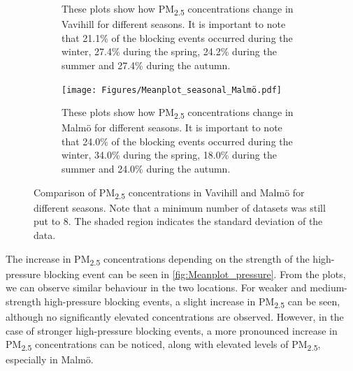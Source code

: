 \begin{figure}[H]
\begin{subfigure}[b]{0.49\textwidth}
        \caption{These plots show how PM\textsubscript{2.5} concentrations change in Vavihill for different seasons. It is important to note that 21.1\% of the blocking events occurred during the winter, 27.4\% during the spring, 24.2\% during the summer and 27.4\% during the autumn.}
        \label{fig:Meanplot_seasonal_Vavihill}
    \end{subfigure}
    \hfill
    \begin{subfigure}[b]{0.49\textwidth}
        \centering
        \texttt{[image: Figures/Meanplot\_seasonal\_Malmö.pdf]}
        \caption{These plots show how PM\textsubscript{2.5} concentrations change in Malmö for different seasons. It is important to note that 24.0\% of the blocking events occurred during the winter, 34.0\% during the spring, 18.0\% during the summer and 24.0\% during the autumn.}
        \label{fig:Meanplot_seasonal_Malmö}
    \end{subfigure}
    \caption{Comparison of PM\textsubscript{2.5} concentrations in Vavihill and Malmö for different seasons. Note that a minimum number of datasets was still put to 8. The shaded region indicates the standard deviation of the data. }
    \label{fig:Meanplot_seasonal}
\end{figure}

The increase in PM\textsubscript{2.5} concentrations depending on the strength of the high-pressure blocking event can be seen in \autoref{fig:Meanplot_pressure}. From the plots, we can observe similar behaviour in the two locations. For weaker and medium-strength high-pressure blocking events, a slight increase in PM\textsubscript{2.5} can be seen, although no significantly elevated concentrations are observed. However, in the case of stronger high-pressure blocking events, a more pronounced increase in PM\textsubscript{2.5} concentrations can be noticed, along with elevated levels of PM\textsubscript{2.5}, especially in Malmö.

